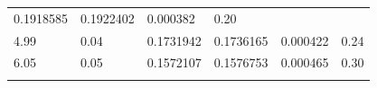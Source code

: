 \documentclass[]{article}
\begin{document}
\begin{longtable}[]{@{}llllll@{}}
\begin{minipage}[t]{0.21\columnwidth}
0.1918585\strut
\end{minipage} & \begin{minipage}[t]{0.14\columnwidth}\raggedright
0.1922402\strut
\end{minipage} & \begin{minipage}[t]{0.13\columnwidth}\raggedright
0.000382\strut
\end{minipage} & \begin{minipage}[t]{0.08\columnwidth}\raggedright
0.20\strut
\end{minipage}\tabularnewline
\begin{minipage}[t]{0.12\columnwidth}\raggedright
4.99\strut
\end{minipage} & \begin{minipage}[t]{0.16\columnwidth}\raggedright
0.04\strut
\end{minipage} & \begin{minipage}[t]{0.21\columnwidth}\raggedright
0.1731942\strut
\end{minipage} & \begin{minipage}[t]{0.14\columnwidth}\raggedright
0.1736165\strut
\end{minipage} & \begin{minipage}[t]{0.13\columnwidth}\raggedright
0.000422\strut
\end{minipage} & \begin{minipage}[t]{0.08\columnwidth}\raggedright
0.24\strut
\end{minipage}\tabularnewline
\begin{minipage}[t]{0.12\columnwidth}\raggedright
6.05\strut
\end{minipage} & \begin{minipage}[t]{0.16\columnwidth}\raggedright
0.05\strut
\end{minipage} & \begin{minipage}[t]{0.21\columnwidth}\raggedright
0.1572107\strut
\end{minipage} & \begin{minipage}[t]{0.14\columnwidth}\raggedright
0.1576753\strut
\end{minipage} & \begin{minipage}[t]{0.13\columnwidth}\raggedright
0.000465\strut
\end{minipage} & \begin{minipage}[t]{0.08\columnwidth}\raggedright
0.30\strut
\end{minipage}\tabularnewline
\begin{minipage}[t]{0.12\columnwidth}\raggedright

\end{minipage}
\end{longtable}
\end{document}
